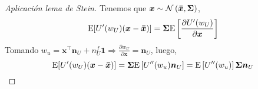 \documentclass{article}
\newenvironment{boxedproof}
  {\begin{mdframed}\begin{proof}}
  {\end{proof}\end{mdframed}}
\begin{document}
\begin{boxedproof}[Aplicación lema de \textit{Stein}]
    Tenemos que $\bm{x}\sim\mathcal{N}\left(\bm{\Bar{x}},\bm{\Sigma}\right)$, 
    \begin{equation*}
    \begin{split}
        \mathrm{E}[U'(w_{U})(\bm{x}-\bm{\Bar{x}})] &= \bm{\Sigma}\mathrm{E}\left[ \frac{\partial U'(w_{U})}{\partial \bm{x}}\right]\\
    \end{split}
    \end{equation*}
    Tomando $w_{u} = \bm{x^{\intercal}}\bm{n}_{U} + n^{f}_{U}\bm{1}\Rightarrow \frac{\partial w_{U}}{\partial \bm{x}} = \bm{n}_{U}$, luego,
    \begin{equation*}
        \mathrm{E}[U'(w_{U})(\bm{x}-\bm{\Bar{x}})] = \bm{\Sigma}\mathrm{E}\left[U''(w_{u})\bm{n}_{U}\right] = \mathrm{E}\left[U''(w_{u})\right]\bm{\Sigma}\bm{n}_{U}
    \end{equation*}
\end{boxedproof}
\end{document}
